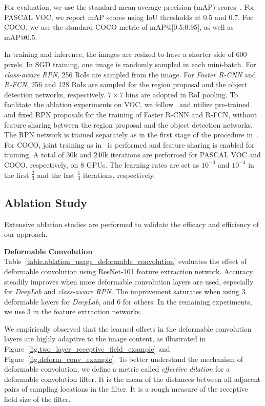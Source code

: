 \documentclass[10pt,twocolumn,letterpaper]{article}
\begin{document}
For evaluation, we use the standard mean average precision (mAP) scores~\cite{everingham2010pascal,lin2014coco}. For PASCAL VOC, we report mAP scores using IoU thresholds at 0.5 and 0.7. For COCO, we use the standard COCO metric of mAP@[0.5:0.95], as well as mAP@0.5.

In training and inference, the images are resized to have a shorter side of 600 pixels. In SGD training, one image is randomly sampled in each mini-batch. For \emph{class-aware RPN}, 256 RoIs are sampled from the image. For \emph{Faster R-CNN} and \emph{R-FCN}, 256 and 128 RoIs are sampled for the region proposal and the object detection networks, respectively. $7\times 7$ bins are adopted in RoI pooling. To facilitate the ablation experiments on VOC, we follow~\cite{lin2016feature} and utilize pre-trained and fixed RPN proposals for the training of Faster R-CNN and R-FCN, without feature sharing between the region proposal and the object detection networks. The RPN network is trained separately as in the first stage of the procedure in~\cite{ren2015faster}. For COCO, joint training as in~\cite{ren2016faster} is performed and feature sharing is enabled for training. A total of 30k and 240k iterations are performed for PASCAL VOC and COCO, respectively, on 8 GPUs. The learning rates are set as $10^{-3}$ and $10^{-4}$ in the first $\frac{2}{3}$ and the last $\frac{1}{3}$ iterations, respectively.

\subsection{Ablation Study}
\label{sec.experiment_ablation}

Extensive ablation studies are performed to validate the efficacy and efficiency of our approach.

\textbf{Deformable Convolution} Table~\ref{table.ablation_usage_deformable_convolution} evaluates the effect of deformable convolution using ResNet-101 feature extraction network. Accuracy steadily improves when more deformable convolution layers are used, especially for \emph{DeepLab} and \emph{class-aware RPN}. The improvement saturates when using $3$ deformable layers for \emph{DeepLab}, and $6$ for others. In the remaining experiments, we use $3$ in the feature extraction networks.

We empirically observed that the learned offsets in the deformable convolution layers are highly adaptive to the image content, as illustrated in Figure~\ref{fig.two_layer_receptive_field_example} and Figure~\ref{fig.deform_conv_example}. To better understand the mechanism of deformable convolution, we define a metric called \emph{effective dilation} for a deformable convolution filter. It is the mean of the distances between all adjacent pairs of sampling locations in the filter. It is a rough measure of the receptive field size of the filter.
\end{document}
